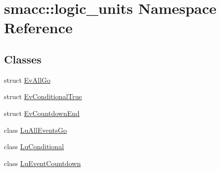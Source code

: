 \hypertarget{namespacesmacc_1_1logic__units}{}\section{smacc\+:\+:logic\+\_\+units Namespace Reference}
\label{namespacesmacc_1_1logic__units}
\subsection*{Classes}
\begin{DoxyCompactItemize}
\item 
struct \hyperlink{structsmacc_1_1logic__units_1_1EvAllGo}{Ev\+All\+Go}
\item 
struct \hyperlink{structsmacc_1_1logic__units_1_1EvConditionalTrue}{Ev\+Conditional\+True}
\item 
struct \hyperlink{structsmacc_1_1logic__units_1_1EvCountdownEnd}{Ev\+Countdown\+End}
\item 
class \hyperlink{classsmacc_1_1logic__units_1_1LuAllEventsGo}{Lu\+All\+Events\+Go}
\item 
class \hyperlink{classsmacc_1_1logic__units_1_1LuConditional}{Lu\+Conditional}
\item 
class \hyperlink{classsmacc_1_1logic__units_1_1LuEventCountdown}{Lu\+Event\+Countdown}
\end{DoxyCompactItemize}

